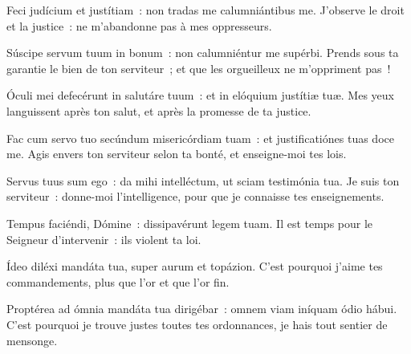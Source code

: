 \begin{paracol}{2}

\LigneParacol{0cm}
{Feci judícium et justítiam~: \GreStar{} non tradas me calumniántibus me.}
{J'observe le droit et la justice~: ne m'abandonne pas à mes oppresseurs.}

\LigneParacol{0.2cm}
{Súscipe servum tuum in bonum~: \GreStar{} non calumniéntur me supérbi.}
{Prends sous ta garantie le bien de ton serviteur~; et que les orgueilleux ne m'oppriment pas~!}

\LigneParacol{0.2cm}
{Óculi mei defecérunt in salutáre tuum~: \GreStar{} et in elóquium justítiæ tuæ.}
{Mes yeux languissent après ton salut, et après la promesse de ta justice.}

\LigneParacol{0.2cm}
{Fac cum servo tuo secúndum misericórdiam tuam~: \GreStar{} et justificatiónes tuas doce me.}
{Agis envers ton serviteur selon ta bonté, et enseigne-moi tes lois.}

\LigneParacol{0.2cm}
{Servus tuus sum ego~: \GreStar{} da mihi intelléctum, ut sciam testimónia tua.}
{Je suis ton serviteur~: donne-moi l'intelligence, pour que je connaisse tes enseignements.}

\LigneParacol{0.2cm}
{Tempus faciéndi, Dómine~: \GreStar{} dissipavérunt legem tuam.}
{Il est temps pour le Seigneur d'intervenir~: ils violent ta loi.}

\LigneParacol{0.2cm}
{Ídeo diléxi mandáta tua, \GreStar{} super aurum et topázion.}
{C'est pourquoi j'aime tes commandements, plus que l'or et que l'or fin.}

\LigneParacol{0.2cm}
{Proptérea ad ómnia mandáta tua dirigébar~: \GreStar{} omnem viam iníquam ódio hábui.}
{C'est pourquoi je trouve justes toutes tes ordonnances, je hais tout sentier de mensonge.  }

\end{paracol}
